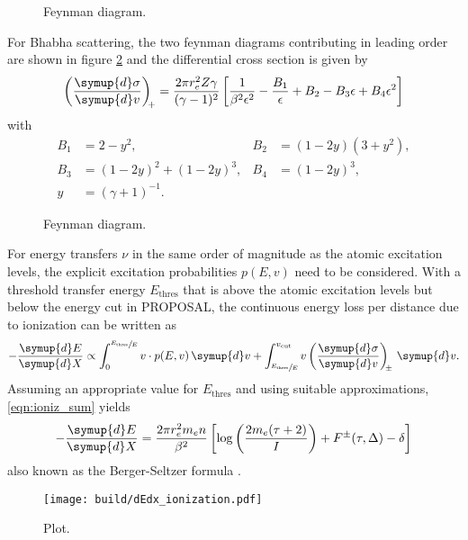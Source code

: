 \begin{figure}
    \centering
    
    \caption{Feynman diagram.}
    \label{fig:feynman_moller}
\end{figure}

For Bhabha scattering, the two feynman diagrams contributing in leading order are shown in figure \ref{fig:feynman_bhabha} and the differential cross section \cite{PhysRev.93.38} is given by
%
\begin{equation}
	\label{eqn:moller}
	\left(\frac{\symup{d}\sigma}{\symup{d}v}\right)_{\!\!+} = \frac{2 \pi r_e^2 Z \gamma}{(\gamma - 1)^2} \left[ \frac{1}{\beta^2 \epsilon^2} - \frac{B_1}{\epsilon} + B_2 - B_3 \epsilon + B_4 \epsilon^2 \right]
\end{equation}
%
with
%
\begin{align*}
	B_1 &= 2 - y^2, & B_2 &= (1 - 2y)(3 + y^2), \\ 
	B_3 &= (1-2y)^2 + (1 - 2y)^3, & B_4 &= (1 - 2y)^3, \\
	y &= (\gamma + 1)^{-1}.
\end{align*}

\begin{figure}
    \centering
    
    \caption{Feynman diagram.}
    \label{fig:feynman_bhabha}
\end{figure}

For energy transfers $\nu$ in the same order of magnitude as the atomic excitation levels, the explicit excitation probabilities $p(E, v)$ need to be considered.
With a threshold transfer energy $E_{\text{thres}}$ that is above the atomic excitation levels but below the energy cut in PROPOSAL, the continuous energy loss per distance due to ionization can be written as
%
\begin{equation}
	\label{eqn:ioniz_sum}
	-\frac{\symup{d}E}{\symup{d}X} \propto \int_{0}^{\sfrac{E_{\text{thres}}}{E}} v \cdot p(E, v) \, \symup{d}v + \int_{\sfrac{E_{\text{thres}}}{E}}^{v_{\text{cut}}} v \left(\frac{\symup{d}\sigma}{\symup{d}v}\right)_{\!\!\pm} \, \symup{d}v. 
\end{equation}
%
Assuming an appropriate value for $E_{\text{thres}}$ and using suitable approximations, \eqref{eqn:ioniz_sum} yields
%
\begin{equation}
	- \frac{\symup{d}E}{\symup{d}X} = \frac{2 \pi r_e^2 m_e n}{\beta^2} \left[ \log{\left( \frac{2 m_e (\tau + 2)}{I} \right) + F^{\pm}(\tau, \Delta) - \delta } \right]
\end{equation}
%
also known as the Berger-Seltzer formula \cite{Hirayama:2005zm}.
\begin{figure}
    \centering
    \texttt{[image: build/dEdx\_ionization.pdf]}
    \caption{Plot.}
    \label{fig:dEdx_ionization}
\end{figure}

